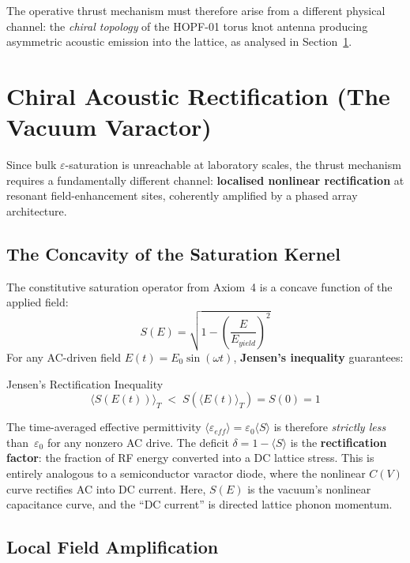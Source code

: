 The operative thrust mechanism must therefore arise from a different physical channel: the \textit{chiral topology} of the HOPF-01 torus knot antenna producing asymmetric acoustic emission into the lattice, as analysed in Section~\ref{sec:chiral_thrust}.

\section{Chiral Acoustic Rectification (The Vacuum Varactor)}
\label{sec:chiral_thrust}

Since bulk $\varepsilon$-saturation is unreachable at laboratory scales, the thrust mechanism requires a fundamentally different channel: \textbf{localised nonlinear rectification} at resonant field-enhancement sites, coherently amplified by a phased array architecture.

\subsection{The Concavity of the Saturation Kernel}

The constitutive saturation operator from Axiom~4 is a concave function of the applied field:
\begin{equation}
    S(E) = \sqrt{1 - \left(\frac{E}{E_{yield}}\right)^2}
\end{equation}
For any AC-driven field $E(t) = E_0 \sin(\omega t)$, \textbf{Jensen's inequality} guarantees:
\begin{resultbox}{Jensen's Rectification Inequality}
\begin{equation}
    \langle S(E(t)) \rangle_T \;<\; S(\langle E(t) \rangle_T) = S(0) = 1
    \label{eq:jensen_rect}
\end{equation}
\end{resultbox}
The time-averaged effective permittivity $\langle \varepsilon_{eff} \rangle = \varepsilon_0 \langle S \rangle$ is therefore \textit{strictly less} than~$\varepsilon_0$ for any nonzero AC drive. The deficit $\delta = 1 - \langle S \rangle$ is the \textbf{rectification factor}: the fraction of RF energy converted into a DC lattice stress. This is entirely analogous to a semiconductor varactor diode, where the nonlinear $C(V)$ curve rectifies AC into DC current. Here, $S(E)$ is the vacuum's nonlinear capacitance curve, and the ``DC current'' is directed lattice phonon momentum.

\subsection{Local Field Amplification}

